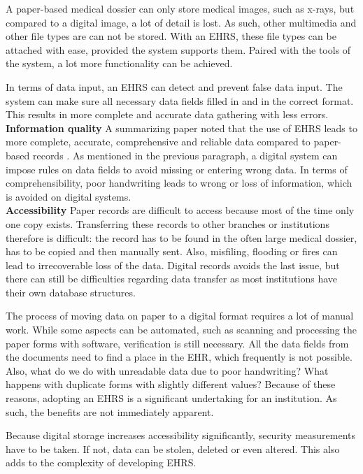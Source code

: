         A paper-based medical dossier can only store medical images, such as x-rays, but compared to a digital image, a lot of detail is lost. As such, other multimedia and other file types are can not be stored. With an EHRS, these file types can be attached with ease, provided the system supports them. Paired with the tools of the system, a lot more functionality can be achieved.

        In terms of data input, an EHRS can detect and prevent false data input. The system can make sure all necessary data fields filled in and in the correct format. This results in more complete and accurate data gathering with less errors.\\

        \noindent\textbf{Information quality} A summarizing paper noted that the use of EHRS leads to more complete, accurate, comprehensive and reliable data compared to paper-based records \cite{ehrs_summary}. As mentioned in the previous paragraph, a digital system can impose rules on data fields to avoid missing or entering wrong data. In terms of comprehensibility, poor handwriting leads to wrong or loss of information, which is avoided on digital systems.\\

        \noindent\textbf{Accessibility} Paper records are difficult to access because most of the time only one copy exists. Transferring these records to other branches or institutions therefore is difficult: the record has to be found in the often large medical dossier, has to be copied and then manually sent. Also, misfiling, flooding or fires can lead to irrecoverable loss of the data. Digital records avoids the last issue, but there can still be difficulties regarding data transfer as most institutions have their own database structures.

        The process of moving data on paper to a digital format requires a lot of manual work. While some aspects can be automated, such as scanning and processing the paper forms with software, verification is still necessary. All the data fields from the documents need to find a place in the EHR, which frequently is not possible. Also, what do we do with unreadable data due to poor handwriting? What happens with duplicate forms with slightly different values? Because of these reasons, adopting an EHRS is a significant undertaking for an institution. As such, the benefits are not immediately apparent.

        Because digital storage increases accessibility significantly, security measurements have to be taken. If not, data can be stolen, deleted or even altered. This also adds to the complexity of developing EHRS.\\

